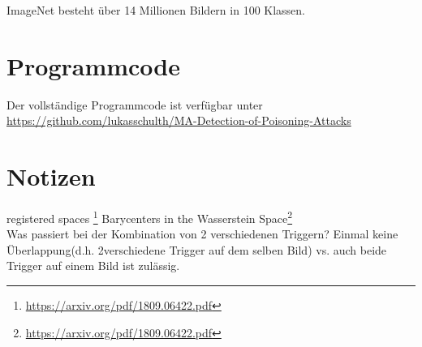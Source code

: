 \documentclass[twoside, 11pt,a4paper]{article}
\numberwithin{equation}{section}
\begin{document}
	ImageNet besteht über 14 Millionen Bildern in 100 Klassen.
	\section{Programmcode}
	Der vollständige Programmcode ist verfügbar unter \url{https://github.com/lukasschulth/MA-Detection-of-Poisoning-Attacks}
	
	
	\section{Notizen}
	registered spaces \footnote{\url{https://arxiv.org/pdf/1809.06422.pdf}}
	Barycenters in the Wasserstein Space\footnote{\url{https://arxiv.org/pdf/1809.06422.pdf}}\\
	Was passiert bei der Kombination von 2 verschiedenen Triggern? Einmal keine Überlappung(d.h. 2verschiedene Trigger auf dem selben Bild) vs. auch beide Trigger auf einem Bild ist zulässig.
	\newpage
	
	\printglossaries
	
	\newpage
	
	
	
	
	
	
	
\end{document}
